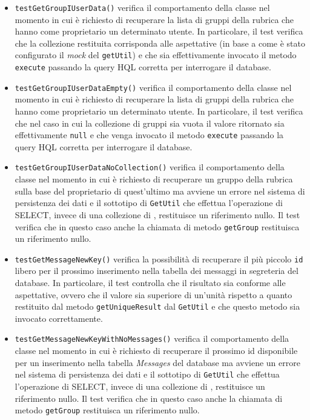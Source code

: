 \begin{itemize}
\begin{itemize}
\item \texttt{testGetGroupIUserData()} verifica il comportamento della classe nel momento in cui è richiesto di recuperare la lista di gruppi della rubrica che hanno come proprietario un determinato utente. In particolare, il test verifica che la collezione restituita corrisponda alle aspettative (in base a come è stato configurato il \textit{mock} del \texttt{getUtil}) e che sia effettivamente invocato il metodo \texttt{execute} passando la query HQL corretta per interrogare il database.

\item \texttt{testGetGroupIUserDataEmpty()} verifica il comportamento della classe nel momento in cui è richiesto di recuperare la lista di gruppi della rubrica che hanno come proprietario un determinato utente. In particolare, il test verifica che nel caso in cui la collezione di gruppi sia vuota il valore ritornato sia effettivamente \texttt{null} e che venga invocato il metodo \texttt{execute} passando la query HQL corretta per interrogare il database.

\item \texttt{testGetGroupIUserDataNoCollection()} verifica il comportamento della classe nel momento in cui è richiesto di recuperare un gruppo della rubrica sulla base del proprietario di quest'ultimo ma avviene un errore nel sistema di persistenza dei dati e il sottotipo di \texttt{GetUtil} che effettua l'operazione di SELECT, invece di una collezione di , restituisce un riferimento nullo. Il test verifica che in questo caso anche la chiamata di metodo \texttt{getGroup} restituisca un riferimento nullo.

\item \texttt{testGetMessageNewKey()} verifica la possibilità di recuperare il più piccolo \texttt{id} libero per il prossimo inserimento nella tabella dei messaggi in segreteria del database. In particolare, il test controlla che il risultato sia conforme alle aspettative, ovvero che il valore sia superiore di un'unità rispetto a quanto restituito dal metodo \texttt{getUniqueResult} dal \texttt{GetUtil} e che questo metodo sia invocato correttamente.

\item \texttt{testGetMessageNewKeyWithNoMessages()} verifica il comportamento della classe nel momento in cui è richiesto di recuperare il prossimo id disponibile per un inserimento nella tabella \textsl{Messages} del database ma avviene un errore nel sistema di persistenza dei dati e il sottotipo di \texttt{GetUtil} che effettua l'operazione di SELECT, invece di una collezione di , restituisce un riferimento nullo. Il test verifica che in questo caso anche la chiamata di metodo \texttt{getGroup} restituisca un riferimento nullo.


\end{itemize}
\end{itemize}
